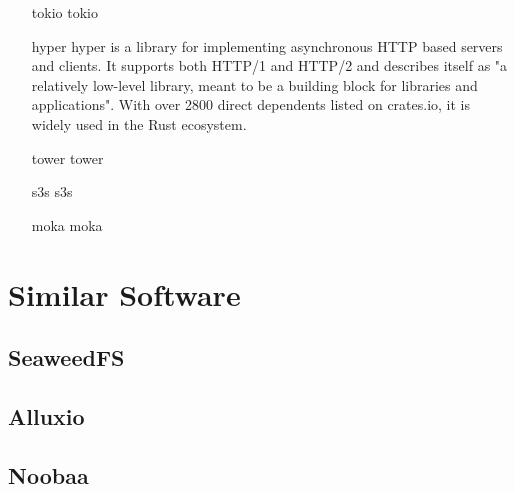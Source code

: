 \begin{enumerate}
	\item[tokio] tokio\cite{TOKIO_GITHUB}
	\item[hyper] hyper\cite{HYPER_GITHUB} is a library for implementing asynchronous HTTP based servers and clients. It supports both HTTP/1 and HTTP/2 and describes itself as "a relatively low-level library, meant to be a building block for libraries and applications"\cite{HYPER_GITHUB}. With over 2800\cite{HYPER_CRATESIO} direct dependents listed on crates.io, it is widely used in the Rust ecosystem.
	\item[tower] tower\cite{TOWER_GITHUB}
	\item[s3s] s3s\cite{S3S_GITHUB}
	\item[moka] moka\cite{MOKA_GITHUB}
\end{enumerate}

\section{Similar Software}
\subsection{SeaweedFS}
\subsection{Alluxio}
\subsection{Noobaa}